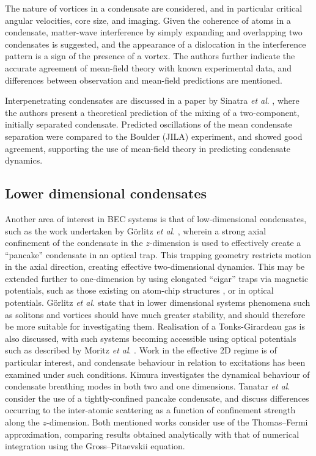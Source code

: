 The nature of vortices in a condensate are considered, and in particular critical angular velocities, core size, and imaging. Given the coherence of atoms in a condensate, matter-wave interference by simply expanding and overlapping two condensates is suggested, and the appearance of a dislocation in the interference pattern is a sign of the presence of a vortex. The authors further indicate the accurate agreement of mean-field theory with known experimental data, and differences between observation and mean-field predictions are mentioned. %

Interpenetrating condensates are discussed in a paper by Sinatra \textit{et al}. \cite{BEC:Sinatra_prl_1999}, where the authors present a theoretical prediction of the mixing of a two-component, initially separated condensate. Predicted oscillations of the mean condensate separation were compared to the Boulder (JILA) experiment, and showed good agreement, supporting the use of mean-field theory in predicting condensate dynamics.

\subsection{Lower dimensional condensates}\label{sub:coldatom_recent}
Another area of interest in BEC systems is that of low-dimensional condensates, such as the work undertaken by G\"{o}rlitz \textit{et al}. \cite{BEC:Gorlitz_prl_2001}, wherein a strong axial confinement of the
condensate in the $z$-dimension is used to effectively create a ``pancake'' condensate in an optical trap. This trapping geometry restricts motion in the axial direction, creating effective two-dimensional dynamics. This may be extended further to one-dimension by using elongated ``cigar'' traps via magnetic potentials, such as those existing on atom-chip structures \cite{AO:Denschlag_prl_1999,AO:Folman_prl_2000,AO:Haase_pra_2001}, or in optical potentials. G\"{o}rlitz \textit{et al.} state that in lower dimensional systems phenomena such as solitons and vortices should have much greater stability, and should therefore be more suitable for investigating them. Realisation of a Tonks-Girardeau gas is also discussed, with such systems becoming accessible using optical potentials such as described by Moritz \textit{et al}. \cite{OL:Moritz_prl_2003}. Work in the effective 2D regime is of particular interest, and condensate behaviour in relation to excitations has been examined under such conditions. Kimura \cite{BEC:Kimura_pra_2002} investigates the dynamical behaviour of condensate breathing modes in both two and one dimensions. Tanatar \textit{et al}. \cite{BEC:Tanatar_arxiv_2002} consider the use of a tightly-confined pancake condensate, and discuss differences occurring to the inter-atomic scattering as a function of confinement strength along the $z$-dimension. Both mentioned works consider use of the Thomas--Fermi approximation, comparing results obtained analytically with that of numerical integration using the Gross--Pitaevskii equation.

